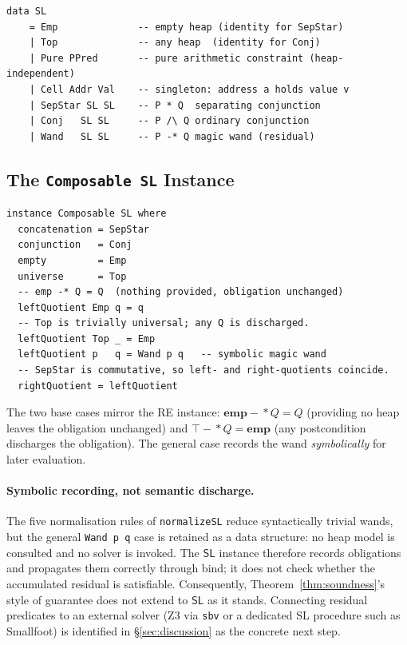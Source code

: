 \documentclass[acmsmall,screen]{acmart}
\newcommand{\SL}{\mathsf{SL}}
\newcommand{\wand}{-\!\!*}
\begin{document}
\begin{lstlisting}
data SL
    = Emp              -- empty heap (identity for SepStar)
    | Top              -- any heap  (identity for Conj)
    | Pure PPred       -- pure arithmetic constraint (heap-independent)
    | Cell Addr Val    -- singleton: address a holds value v
    | SepStar SL SL    -- P * Q  separating conjunction
    | Conj   SL SL     -- P /\ Q ordinary conjunction
    | Wand   SL SL     -- P -* Q magic wand (residual)
\end{lstlisting}

\subsection{The \texorpdfstring{\lstinline{Composable SL}}{Composable SL} Instance}

\begin{lstlisting}
instance Composable SL where
  concatenation = SepStar
  conjunction   = Conj
  empty         = Emp
  universe      = Top
  -- emp -* Q = Q  (nothing provided, obligation unchanged)
  leftQuotient Emp q = q
  -- Top is trivially universal; any Q is discharged.
  leftQuotient Top _ = Emp
  leftQuotient p   q = Wand p q   -- symbolic magic wand
  -- SepStar is commutative, so left- and right-quotients coincide.
  rightQuotient = leftQuotient
\end{lstlisting}

\noindent
The two base cases mirror the RE instance:
$\mathbf{emp} \wand Q = Q$ (providing no heap leaves the obligation unchanged)
and $\top \wand Q = \mathbf{emp}$ (any postcondition discharges the obligation).
The general case records the wand \emph{symbolically} for later evaluation.

\paragraph{Symbolic recording, not semantic discharge.}
The five normalisation rules of \lstinline{normalizeSL} reduce syntactically
trivial wands, but the general \lstinline{Wand p q} case is retained as a
data structure: no heap model is consulted and no solver is invoked.
The $\SL$ instance therefore records obligations and propagates them correctly
through bind; it does not check whether the accumulated residual is
satisfiable.
Consequently, Theorem~\ref{thm:soundness}'s style of guarantee does not
extend to $\SL$ as it stands.
Connecting residual predicates to an external solver (Z3 via \lstinline{sbv}
or a dedicated SL procedure such as Smallfoot) is identified in
\S\ref{sec:discussion} as the concrete next step.
\end{document}
